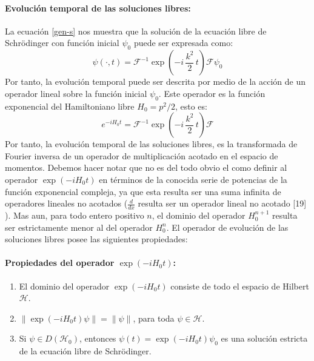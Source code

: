\documentclass[12pt]{book}
\numberwithin{equation}{chapter}
\def\H{\mathcal{H}}
\def\F{\mathcal{F}}
\begin{document}
\paragraph{Evoluci\'on temporal de las soluciones libres: } 
La ecuaci\'on \eqref{gen-s} nos muestra que la soluci\'on de la ecuaci\'on libre de Schr\"odinger con funci\'on inicial $\psi_{0}$ puede ser expresada como:
\begin{equation}
\psi (\cdot , t)= \F^{-1} \exp \left( -i\, \frac{k^{2}}{2}\, t \right) \F \psi_{0}
\end{equation}
Por tanto, la evoluci\'on temporal puede ser descrita por medio de la acci\'on de un operador lineal sobre la funci\'on inicial $\psi_{0}$. Este operador es la funci\'on exponencial del Hamiltoniano libre $H_{0}= p^{2}/2$, esto es:
\begin{equation}\label{evv}
e^{-iH_{0}t}=  \F^{-1} \exp \left( -i\, \frac{k^{2}}{2}\, t \right) \F
\end{equation}
Por tanto, la evoluci\'on temporal de las soluciones libres, es la transformada de Fourier inversa de un operador de multiplicaci\'on acotado en el espacio de momentos. Debemos hacer notar que no es del todo obvio el como definir al operador $\exp (-iH_{0}t)$ en t\'erminos de la conocida serie de potencias de la funci\'on exponencial compleja, ya que esta resulta ser una suma infinita de operadores lineales no acotados ($\frac{d}{dx}$ resulta ser un operador lineal no acotado [19] ). Mas aun, para todo entero positivo $n$, el dominio del operador $H_{0}^{n+1}$ resulta ser estrictamente menor al del operador $H_{0}^{n}$. El operador de evoluci\'on de las soluciones libres posee las siguientes propiedades:

\paragraph{Propiedades del operador $\exp (-iH_{0}t)$: }
\begin{enumerate}
\item El dominio del operador $\exp (-iH_{0}t)$ consiste de todo el espacio de Hilbert $\H$.

\item $\| \exp (-iH_{0}t) \psi \| = \| \psi \|$, para toda $\psi \in \H$.

\item Si $ \psi \in D(\H_{0}) $, entonces $\psi (t)= \exp (-iH_{0}t) \psi_{0} $ es una soluci\'on estricta de la ecuaci\'on libre de Schr\"odinger.
\end{enumerate}
\rightline{$\dag$}
\vspace{3 mm} 
\end{document}
